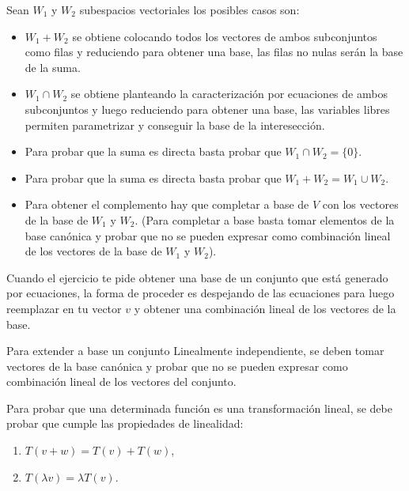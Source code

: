 \documentclass[a4,10pt]{aleph-notas}
\begin{document}
\begin{obs}
    Sean $W_1$ y $W_2$ subespacios vectoriales los posibles casos son:
    \begin{itemize}
        \item $W_1+W_2$ se obtiene colocando todos los vectores de ambos subconjuntos como filas y reduciendo para obtener una base, las filas no nulas serán la base de la suma.
        \item $W_1 \cap W_2$ se obtiene planteando la caracterización por ecuaciones de ambos subconjuntos y luego reduciendo para obtener una base, las variables libres permiten parametrizar y conseguir la base de la interesección.
        \item Para probar que la suma es directa basta probar que $W_1 \cap W_2 = \{0\}$.
        \item Para probar que la suma es directa basta probar que $W_1 + W_2 = W_1 \cup W_2$. 
        \item Para obtener el complemento hay que completar a base de $V$ con los vectores de la base de $W_1$ y $W_2$. (Para completar a base basta tomar elementos de la base canónica y probar que no se pueden expresar como combinación lineal de los vectores de la base de $W_1$ y $W_2$).
    \end{itemize}
\end{obs}

\begin{obs}
    Cuando el ejercicio te pide obtener una base de un conjunto que está generado por ecuaciones, la forma de proceder es despejando de las ecuaciones para luego reemplazar en tu vector $v$ y obtener una combinación lineal de los vectores de la base.
\end{obs}

\begin{obs}
    Para extender a base un conjunto Linealmente independiente, se deben tomar vectores de la base canónica y probar que no se pueden expresar como combinación lineal de los vectores del conjunto.
\end{obs}

\begin{obs}
    Para probar que una determinada función es una transformación lineal, se debe probar que cumple las propiedades de linealidad:
    \begin{enumerate}
        \item $T(v+w) = T(v) + T(w)$,
        \item $T(\lambda v) = \lambda T(v)$.
    \end{enumerate}
\end{obs}
\end{document}
